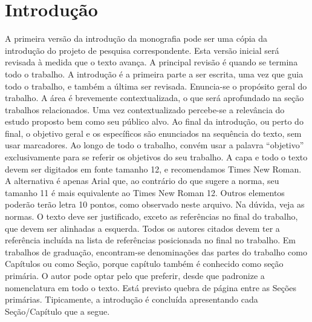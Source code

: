 
\chapter{Introdução}

A primeira versão da introdução da monografia pode ser uma cópia da introdução do projeto de pesquisa correspondente. Esta versão inicial será revisada à medida que o texto avança. A principal revisão é quando se termina todo o trabalho. A introdução é a primeira parte a ser escrita, uma vez que guia todo o trabalho, e também a última ser revisada.
Enuncia-se o propósito geral do trabalho. A área é brevemente contextualizada, o que será aprofundado na seção trabalhos relacionados. Uma vez contextualizado percebe-se a relevância do estudo proposto bem como seu público alvo.
Ao final da introdução, ou perto do final, o objetivo geral e os específicos são enunciados na sequência do texto, sem usar marcadores. Ao longo de todo o trabalho, convém usar a palavra “objetivo” exclusivamente para se referir os objetivos do seu trabalho.
A capa e todo o texto devem ser digitados em fonte tamanho 12, e recomendamos Times New Roman. A alternativa é apenas Arial que, ao contrário do que sugere a norma, seu tamanho 11 é mais equivalente ao Times New Roman 12. Outros elementos poderão terão letra 10 pontos, como observado neste arquivo. Na dúvida, veja as normas. O texto deve ser justificado, exceto as referências no final do trabalho, que devem ser alinhadas a esquerda.
Todos os autores citados devem ter a referência incluída na lista de referências posicionada no final no trabalho.
Em trabalhos de graduação, encontram-se denominações das partes do trabalho como Capítulos ou como Seção, porque capítulo também é conhecido como seção primária. O autor pode optar pelo que preferir, desde que padronize a nomenclatura em todo o texto. Está previsto quebra de página entre as Seções primárias.
Tipicamente, a introdução é concluída apresentando cada Seção/Capítulo que a segue.